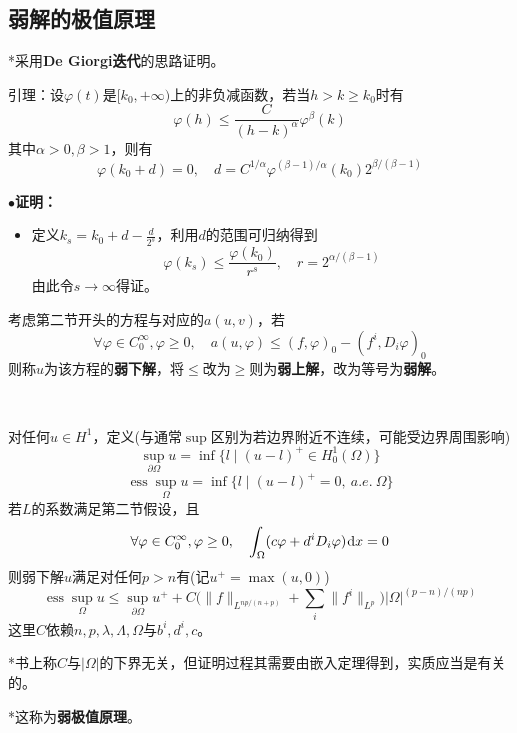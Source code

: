 \documentclass[a4paper,UTF8,fontset=windows,AutoFakeBold]{ctexart}
\newcommand*{\dr}{\hspace{0.07em}\mathrm{d}}
\DeclareMathOperator*{\ess}{ess}
\newcommand{\proo}[1]{{\kaishu $\bullet$\textbf{证明：}
\begin{itemize}
    \item[] #1
\end{itemize}
}}
\begin{document}
\subsection{弱解的极值原理}
*采用\textbf{De Giorgi迭代}的思路证明。

引理：设$\varphi(t)$是$[k_0,+\infty)$上的非负减函数，若当$h>k\ge k_0$时有
$$\varphi(h)\le\frac{C}{(h-k)^\alpha}\varphi^\beta(k)$$
其中$\alpha>0,\beta>1$，则有
$$\varphi(k_0+d)=0,\quad d=C^{1/\alpha}\varphi^{(\beta-1)/\alpha}(k_0)2^{\beta/(\beta-1)}$$

\proo{
    定义$k_s=k_0+d-\frac{d}{2^s}$，利用$d$的范围可归纳得到
    $$\varphi(k_s)\le\frac{\varphi(k_0)}{r^s},\quad r=2^{\alpha/(\beta-1)}$$
    由此令$s\to\infty$得证。
}

考虑第二节开头的方程与对应的$a(u,v)$，若
$$\forall\varphi\in C_0^\infty,\varphi\ge0,\quad a(u,\varphi)\le(f,\varphi)_0-(f^i,D_i\varphi)_0$$
则称$u$为该方程的\textbf{弱下解}，将$\le$改为$\ge$则为\textbf{弱上解}，改为等号为\textbf{弱解}。

\

对任何$u\in H^1$，定义(与通常$\sup$区别为若边界附近不连续，可能受边界周围影响)
$$\sup_{\partial\Omega}u=\inf\{l\mid(u-l)^+\in H_0^1(\Omega)\}$$
$$\ess\sup_\Omega u=\inf\{l\mid(u-l)^+=0,\ a.e.\ \Omega\}$$
若$L$的系数满足第二节假设，且
$$\forall\varphi\in C_0^\infty,\varphi\ge0,\quad\int_\Omega(c\varphi+d^iD_i\varphi)\dr x=0$$
则弱下解$u$满足对任何$p>n$有(记$u^+=\max(u,0)$)
$$\ess\sup_\Omega u\le\sup_{\partial\Omega}u^++C\bigg(\|f\|_{L^{np/(n+p)}}+\sum_i\|f^i\|_{L^p}\bigg)|\Omega|^{(p-n)/(np)}$$
这里$C$依赖$n,p,\lambda,\Lambda,\Omega$与$b^i,d^i,c$。

*书上称$C$与$|\Omega|$的下界无关，但证明过程其需要由嵌入定理得到，实质应当是有关的。

*这称为\textbf{弱极值原理}。
\end{document}
